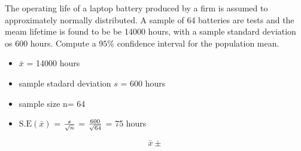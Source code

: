 The operating life of a laptop battery produced by a firm is assumed to approximately normally distributed.
A sample of 64 batteries are tests and the meam lifetime is found to be be 14000 hours, with a sample standard deviation os 600 hours. Compute a $95\%$ confidence interval for the population mean.
\begin{itemize}
\item $\bar{x}$ = 14000 hours
\item sample stadard deviation $s$ = 600 hours
\item sample size n= 64
\item $\mbox{S.E} (\bar{x})$ = ${s \over \sqrt{n} } $ = ${600 \over \sqrt{64}}$ = 75 hours
\end{itemize}
\[  \bar{x} \pm \]

